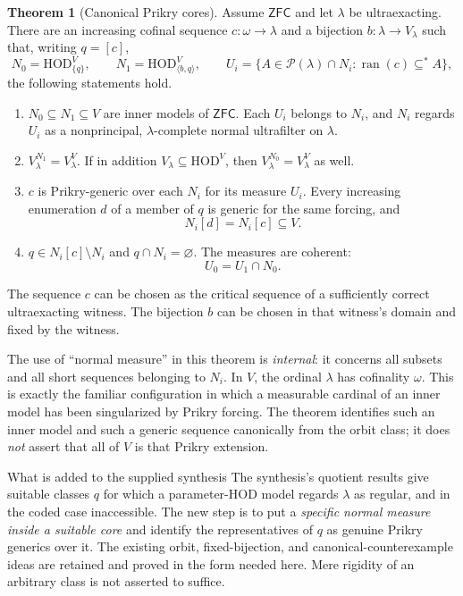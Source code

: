\documentclass[11pt,letterpaper]{article}
\theoremstyle{definition}
\newtheorem{theorem}[definition]{Theorem}
\newcommand{\ZFC}{\mathsf{ZFC}}
\newcommand{\HOD}{\mathrm{HOD}}
\newcommand{\ran}{\operatorname{ran}}
\newcommand{\Pow}{\mathcal P}
\newcommand{\Npar}[2]{\HOD_{\langle #1,#2\rangle}}
\begin{document}
\begin{theorem}[Canonical Prikry cores]\label{thm:main}
Assume $\ZFC$ and let $\lambda$ be ultraexacting. There are an increasing cofinal sequence $c:\omega\to\lambda$ and a bijection $b:\lambda\to V_\lambda$ such that, writing $q=[c]$,
\[
 N_0=\HOD_{\{q\}}^V,\qquad N_1=\Npar bq^V,
 \qquad
 U_i=\{A\in\Pow(\lambda)\cap N_i:\ran(c)\subseteq^* A\},
\]
the following statements hold.
\begin{enumerate}
\item $N_0\subseteq N_1\subseteq V$ are inner models of $\ZFC$. Each $U_i$ belongs to $N_i$, and $N_i$ regards $U_i$ as a nonprincipal, $\lambda$-complete normal ultrafilter on $\lambda$.
\item $V_\lambda^{N_1}=V_\lambda^V$. If in addition $V_\lambda\subseteq\HOD^V$, then $V_\lambda^{N_0}=V_\lambda^V$ as well.
\item $c$ is Prikry-generic over each $N_i$ for its measure $U_i$. Every increasing enumeration $d$ of a member of $q$ is generic for the same forcing, and
\[
                    N_i[d]=N_i[c]\subseteq V.
\]
\item $q\in N_i[c]\setminus N_i$ and $q\cap N_i=\varnothing$. The measures are coherent:
\[
                       U_0=U_1\cap N_0.
\]
\end{enumerate}
The sequence $c$ can be chosen as the critical sequence of a sufficiently correct ultraexacting witness. The bijection $b$ can be chosen in that witness's domain and fixed by the witness.
\end{theorem}

The use of ``normal measure'' in this theorem is \emph{internal}: it concerns all subsets and all short sequences belonging to $N_i$. In $V$, the ordinal $\lambda$ has cofinality $\omega$. This is exactly the familiar configuration in which a measurable cardinal of an inner model has been singularized by Prikry forcing. The theorem identifies such an inner model and such a generic sequence canonically from the orbit class; it does \emph{not} assert that all of $V$ is that Prikry extension.

\begin{assessment}{What is added to the supplied synthesis}
The synthesis's quotient results give suitable classes $q$ for which a parameter-HOD model regards $\lambda$ as regular, and in the coded case inaccessible. The new step is to put a \emph{specific normal measure inside a suitable core} and identify the representatives of $q$ as genuine Prikry generics over it. The existing orbit, fixed-bijection, and canonical-counterexample ideas are retained and proved in the form needed here. Mere rigidity of an arbitrary class is not asserted to suffice.
\end{assessment}
\end{document}
